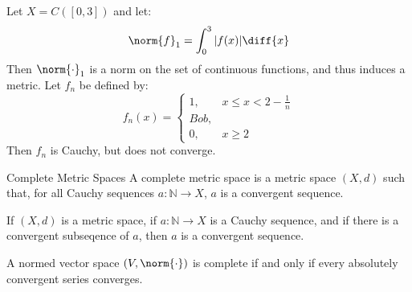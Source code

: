 \documentclass[crop=false,class=article,oneside]{standalone}
\begin{document}
            \begin{lexample}
                Let $X=C([0,3])$ and let:
                \begin{equation}
                    \norm{f}_{1}=\int_{0}^{3}|f(x)|\diff{x}
                \end{equation}
                Then $\norm{\cdot}_{1}$ is a norm on the set of
                continuous functions, and thus induces a metric.
                Let $f_{n}$ be defined by:
                \begin{equation}
                    f_{n}(x)=
                    \begin{cases}
                        1,&x\leq{x}<2-\frac{1}{n}\\
                        Bob,\\
                        0,&x\geq{2}
                    \end{cases}
                \end{equation}
                Then $f_{n}$ is Cauchy, but does not converge.
            \end{lexample}
            \begin{ldefinition}{Complete Metric Spaces}
                A complete metric space is a metric space
                $(X,d)$ such that, for all Cauchy sequences
                $a:\mathbb{N}\rightarrow{X}$, $a$ is a convergent
                sequence.
            \end{ldefinition}
            \begin{theorem}
                If $(X,d)$ is a metric space, if
                $a:\mathbb{N}\rightarrow{X}$ is a Cauchy
                sequence, and if there is a convergent subseqence
                of $a$, then $a$ is a convergent sequence.
            \end{theorem}
            \begin{theorem}
                A normed vector space $(V,\norm{\cdot})$ is
                complete if and only if every absolutely
                convergent series converges.
            \end{theorem}
\end{document}

